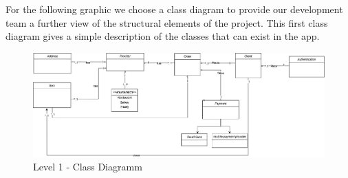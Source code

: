For the following graphic we choose a \gls{class diagram} to provide our development team a further view of the
structural elements of the project. This first class diagram gives a simple description of the classes that can
exist in the app.

\begin{figure}[H]
    \centering
    \includegraphics[width=1\textwidth]{assets/simple_classes_CD.jpg}
    \caption{Level 1 - Class Diagramm}
    \label{fig:simple_class_diagram}
\end{figure}


 




